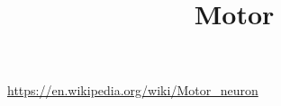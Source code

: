 \documentclass[a4paper]{article}
\title{Motor}
\date{}
\begin{document}
    \maketitle
    \url{https://en.wikipedia.org/wiki/Motor_neuron}
\end{document}
